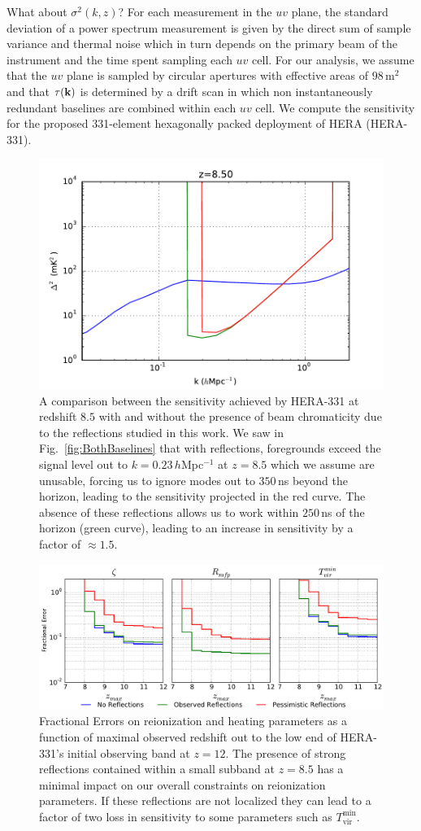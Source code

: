 \documentclass[twocolumn]{emulateapj}
\begin{document}
What about $\sigma^2(k,z)$? For each measurement in the $uv$ plane, the standard deviation of a power spectrum measurement is given by the direct sum of sample variance and thermal noise \citep{McQuinn:2006} which in turn depends on the primary beam of the instrument and the time spent sampling each $uv$ cell. For our analysis, we assume that the $uv$ plane is sampled by circular apertures with effective areas of $98$\,m$^2$ and that $\tau({\bf k})$ is determined by a drift scan in which non instantaneously redundant baselines are combined within each $uv$ cell. We compute the sensitivity for the proposed 331-element hexagonally packed deployment of HERA (HERA-331). 


\begin{figure}
\includegraphics[width=.5\textwidth]{figures/sensitivity_comparison_v2.pdf}
\caption{A comparison between the sensitivity achieved by HERA-331 at redshift $8.5$ with and without the presence of beam chromaticity due to the reflections studied in this work. We saw in Fig.~\ref{fig:BothBaselines} that with reflections, foregrounds exceed the signal level out to $k=0.23$\,$h$Mpc$^{-1}$ at $z=8.5$ which we assume are unusable, forcing us to ignore modes out to $350$\,ns beyond the horizon, leading to the sensitivity projected in the red curve. The absence of these reflections allows us to work within $250$\,ns of the horizon (green curve), leading to an increase in sensitivity by a factor of $\approx 1.5$. }
\label{fig:Sensitivity}
\end{figure}



\begin{figure}
\includegraphics[width=\textwidth]{figures/sigmaVsZ_reionization_v2.pdf}
\caption{Fractional Errors on reionization and heating parameters as a function of maximal observed redshift out to the low end of HERA-331's initial observing band at $z=12$. The presence of strong reflections contained within a small subband at $z=8.5$ has a minimal impact on our overall constraints on reionization parameters. If these reflections are not localized they can lead to a factor of two loss in sensitivity to some parameters such as $T_\text{vir}^\text{min}$.}
\label{fig:Errors}
\end{figure}
\end{document}
